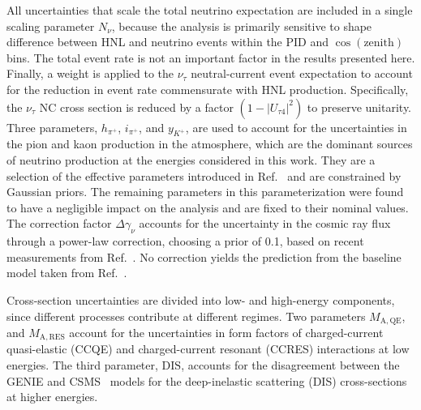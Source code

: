 \documentclass[
    aps,
    prd,
    reprint,
    amsmath,
    amssymb,
    nofootinbib,
    superscriptaddress,
    floatfix
]{revtex4-2}
\renewcommand{\rm}{\mathrm}
\newcommand{\rm}{\mathrm}
\begin{document}
All uncertainties that scale the total neutrino expectation are included in a single scaling parameter $N_{\nu}$, because the analysis is primarily sensitive to shape difference between HNL and neutrino events within the PID and $\cos(\textrm{zenith})$ bins.
The total event rate is not an important factor in the results presented here. Finally, a weight is applied to the $\nu_{\tau}$ neutral-current event expectation to account for the reduction in event rate commensurate with HNL production.
Specifically, the $\nu_\tau$ NC cross section is reduced by a factor $(1 - |U_{\tau 4}|^2)$ to preserve unitarity.
Three parameters, $h_{\pi^+}$, $i_{\pi^+}$, and $y_{K^+}$, are used to account for the uncertainties in the pion and kaon production in the atmosphere, which are the dominant sources of neutrino production at the energies considered in this work.
They are a selection of the effective parameters introduced in Ref.~\cite{Barr:2006it} and are constrained by Gaussian priors.
The remaining parameters in this parameterization were found to have a negligible impact on the analysis and are fixed to their nominal values.
The correction factor $\Delta \gamma_\nu$ accounts for the uncertainty in the cosmic ray flux through a power-law correction, choosing a prior of 0.1, based on recent measurements from Ref.~\cite{PhysRevD.95.023012}.
No correction yields the prediction from the baseline model taken from Ref.~\cite{PhysRevD.92.023004_Honda_Flux}.

Cross-section uncertainties are divided into low- and high-energy components, since different processes contribute at different regimes.
Two parameters $M_\rm{A,QE}$, and $M_\rm{A,RES}$ account for the uncertainties in form factors of charged-current quasi-elastic (CCQE) and charged-current resonant (CCRES) interactions at low energies.
The third parameter, $\rm{DIS}$, accounts for the disagreement between the \textsc{GENIE} and CSMS~\cite{csms} models for the deep-inelastic scattering (DIS) cross-sections at higher energies.
\end{document}
